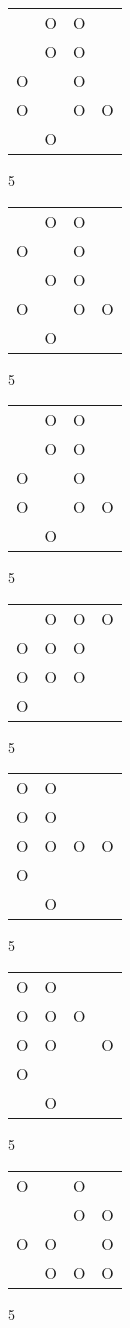 \begin{tabular}{|m{0.2cm}m{0.2cm}m{0.2cm}m{0.2cm}|}\hline
 &O&O& \\
 &O&O& \\
O& &O& \\
O& &O&O\\
 &O& & \\
\hline\end{tabular}5
\begin{tabular}{|m{0.2cm}m{0.2cm}m{0.2cm}m{0.2cm}|}\hline
 &O&O& \\
O& &O& \\
 &O&O& \\
O& &O&O\\
 &O& & \\
\hline\end{tabular}5
\begin{tabular}{|m{0.2cm}m{0.2cm}m{0.2cm}m{0.2cm}|}\hline
 &O&O& \\
 &O&O& \\
O& &O& \\
O& &O&O\\
 &O& & \\
\hline\end{tabular}5
\begin{tabular}{|m{0.2cm}m{0.2cm}m{0.2cm}m{0.2cm}|}\hline
 &O&O&O\\
O&O&O& \\
O&O&O& \\
O& & & \\
\hline\end{tabular}5
\begin{tabular}{|m{0.2cm}m{0.2cm}m{0.2cm}m{0.2cm}|}\hline
O&O& & \\
O&O& & \\
O&O&O&O\\
O& & & \\
 &O& & \\
\hline\end{tabular}5
\begin{tabular}{|m{0.2cm}m{0.2cm}m{0.2cm}m{0.2cm}|}\hline
O&O& & \\
O&O&O& \\
O&O& &O\\
O& & & \\
 &O& & \\
\hline\end{tabular}5
\begin{tabular}{|m{0.2cm}m{0.2cm}m{0.2cm}m{0.2cm}|}\hline
O& &O& \\
 & &O&O\\
O&O& &O\\
 &O&O&O\\
\hline\end{tabular}5
